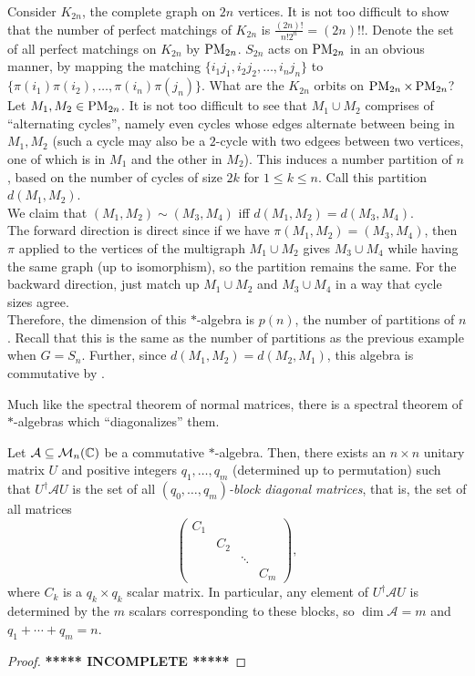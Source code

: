 	\begin{fex}
		Consider $K_{2n}$, the complete graph on $2n$ vertices. It is not too difficult to show that the number of perfect matchings of $K_{2n}$ is $\frac{(2n)!}{n!2^n} = (2n)!!$. Denote the set of all perfect matchings on $K_{2n}$ by $\operatorname{PM}_{2n}$. $S_{2n}$ acts on $\operatorname{PM}_{2n}$ in an obvious manner, by mapping the matching $\{i_1j_1,i_2j_2,\ldots,i_nj_n\}$ to $\{\pi(i_1)\pi(i_2),\ldots,\pi(i_n)\pi(j_n)\}$. What are the $K_{2n}$ orbits on $\operatorname{PM}_{2n} \times \operatorname{PM}_{2n}$?\\
		Let $M_1,M_2 \in \operatorname{PM}_{2n}$. It is not too difficult to see that $M_1 \cup M_2$ comprises of ``alternating cycles'', namely even cycles whose edges alternate between being in $M_1,M_2$ (such a cycle may also be a $2$-cycle with two edgees between two vertices, one of which is in $M_1$ and the other in $M_2$).  This induces a number partition of $n$, based on the number of cycles of size $2k$ for $1 \le k \le n$. Call this partition $d(M_1,M_2)$.\\
		
		We claim that $(M_1,M_2) \sim (M_3,M_4)$ iff $d(M_1,M_2) = d(M_3,M_4)$.\\
		The forward direction is direct since if we have $\pi (M_1,M_2) = (M_3,M_4)$, then $\pi$ applied to the vertices of the multigraph $M_1 \cup M_2$ gives $M_3 \cup M_4$ while having the same graph (up to isomorphism), so the partition remains the same. For the backward direction, just match up $M_1 \cup M_2$ and $M_3 \cup M_4$ in a way that cycle sizes agree.\\

		Therefore, the dimension of this $*$-algebra is $p(n)$, the number of partitions of $n$. Recall that this is the same as the number of partitions as the previous example when $G = S_n$. Further, since $d(M_1,M_2) = d(M_2,M_1)$, this algebra is commutative by .
	\end{fex}

	Much like the spectral theorem of normal matrices, there is a spectral theorem of $*$-algebras which ``diagonalizes'' them.

	\begin{ftheo}
		Let $\mathcal{A} \subseteq \mathcal{M}_n(\mathbb{C})$ be a commutative $*$-algebra. Then, there exists an $n \times n$ unitary matrix $U$ and positive integers $q_1,\ldots,q_m$ (determined up to permutation) such that $U^\dagger \mathcal{A} U$ is the set of all \emph{$(q_0,\ldots,q_m)$-block diagonal matrices}, that is, the set of all matrices
		\[ \begin{pmatrix} C_1 & & & \\ & C_2 & & \\ & & \ddots & \\ & & & C_m \end{pmatrix}, \]
		where $C_k$ is a $q_k \times q_k$ scalar matrix. In particular, any element of $U^\dagger \mathcal{A} U$ is determined by the $m$ scalars corresponding to these blocks, so $\dim \mathcal{A} = m$ and $q_1 + \cdots + q_m = n$.
	\end{ftheo}
	\begin{proof}
		\textbf{***** INCOMPLETE *****}
	\end{proof}

